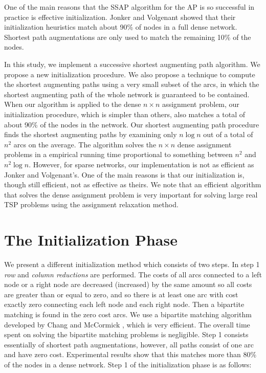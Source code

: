 One of the main reasons that the SSAP algorithm
for the AP is so successful in practice
is effective initialization.
Jonker and Volgenant \cite{jon1} showed that
their initialization heuristics
match about 90\% of nodes in a full dense network. Shortest
path augmentations are only used to match the remaining 10\% of the nodes.

In this study, we implement a successive shortest
augmenting path algorithm.
We propose a new initialization procedure. We also
propose a technique to compute the shortest augmenting paths using a 
very small subset of the arcs, in which the shortest augmenting
path of the whole network is guaranteed to be contained.
When our algorithm is applied to the dense $n\times n$ assignment problem,
our initialization procedure, which is simpler than others,
also matches a total of about 90\% of the nodes in the network.
Our shortest augmenting path procedure finds the 
shortest augmenting paths by examining only 
$n\log n$ out of a total of $n^2$ arcs on the average.
The algorithm solves 
the $n\times n$ dense assignment problems in a empirical running
time proportional
to something between $n^2$ and $n^2\log n$.
However, for sparse networks, our implementation is not
as efficient as Jonker and Volgenant's. One of the main reasons is
that our initialization is, though still efficient, not
as effective as theirs.
We note that an efficient algorithm that solves
the dense assignment problem is very important
for solving large real TSP problems using the assignment relaxation
method.

\section{ The Initialization Phase}

We present a different initialization method
which consists of two steps.
In step 1 {\it row} and {\it column reductions} are performed.
The costs of all arcs connected
to a left node or a right node are decreased (increased) by the same
amount so all costs are greater than or equal to
zero, and so there is at least one arc with cost exactly zero
 connecting each left node and each right node. 
Then a bipartite matching is found in the zero cost arcs. We use
a bipartite matching algorithm developed by Chang and McCormick
\cite{jon1}, which is very efficient. 
The overall time spent on solving the bipartite matching
problems is negligible.
Step 1 consists essentially of shortest path
augmentations, however, all paths consist of one arc and
have zero cost.
Experimental results show that this matches more than 
80\% of the nodes in a dense network. 
Step 1 of the initialization phase is as follows:

